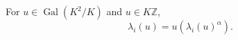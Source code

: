 For $u \in \operatorname{Gal}(K^2/K)$ and $u \in K\mathbb{Z}$,
$$
\lambda_i(u) = u(\lambda_i(u)^{\alpha}).
$$
